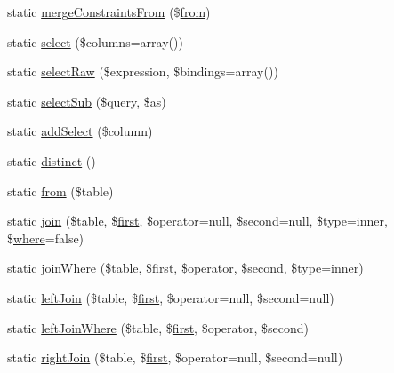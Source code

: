 \begin{DoxyCompactItemize}
\item 
static \mbox{\hyperlink{class_eloquent_a543e7d748eb32bb2b2b526c1519fe3ff}{merge\+Constraints\+From}} (\$\mbox{\hyperlink{class_eloquent_ac379856973100a47e6c99a30189be914}{from}})
\item 
static \mbox{\hyperlink{class_eloquent_a8e370395d0f8769923458070affe6569}{select}} (\$columns=array())
\item 
static \mbox{\hyperlink{class_eloquent_abaad4d45b5af66399360943de7e06088}{select\+Raw}} (\$expression, \$bindings=array())
\item 
static \mbox{\hyperlink{class_eloquent_af3d3893d466f371ddee0d6ec27fe4346}{select\+Sub}} (\$query, \$as)
\item 
static \mbox{\hyperlink{class_eloquent_af424d9b4dbb022b5320947d1d7316019}{add\+Select}} (\$column)
\item 
static \mbox{\hyperlink{class_eloquent_a0d922f51ce3d5fb3033a90a04edb2cf3}{distinct}} ()
\item 
static \mbox{\hyperlink{class_eloquent_ac379856973100a47e6c99a30189be914}{from}} (\$table)
\item 
static \mbox{\hyperlink{class_eloquent_aa041492793f1023acbce5a83b55b8cca}{join}} (\$table, \$\mbox{\hyperlink{class_eloquent_a9a02499790abaadb7a9dc307a2b8403a}{first}}, \$operator=null, \$second=null, \$type=\textquotesingle{}inner\textquotesingle{}, \$\mbox{\hyperlink{class_eloquent_a73746da2a8ac07c59c577acde0606d5d}{where}}=false)
\item 
static \mbox{\hyperlink{class_eloquent_ae729011c181ac1a0bbf3b1a8b729f4c0}{join\+Where}} (\$table, \$\mbox{\hyperlink{class_eloquent_a9a02499790abaadb7a9dc307a2b8403a}{first}}, \$operator, \$second, \$type=\textquotesingle{}inner\textquotesingle{})
\item 
static \mbox{\hyperlink{class_eloquent_aca726c1b1d75be9165046973b7fde75a}{left\+Join}} (\$table, \$\mbox{\hyperlink{class_eloquent_a9a02499790abaadb7a9dc307a2b8403a}{first}}, \$operator=null, \$second=null)
\item 
static \mbox{\hyperlink{class_eloquent_a0028d51e963f25f4e3bc2e8f8595457f}{left\+Join\+Where}} (\$table, \$\mbox{\hyperlink{class_eloquent_a9a02499790abaadb7a9dc307a2b8403a}{first}}, \$operator, \$second)
\item 
static \mbox{\hyperlink{class_eloquent_a523091b2e22ae2ec38c67cea95e6b032}{right\+Join}} (\$table, \$\mbox{\hyperlink{class_eloquent_a9a02499790abaadb7a9dc307a2b8403a}{first}}, \$operator=null, \$second=null)
\item 

\end{DoxyCompactItemize}

